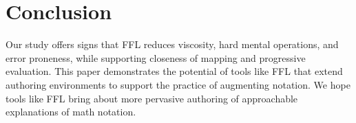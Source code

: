 \section{Conclusion}

Our study offers signs that FFL reduces viscosity, hard mental operations, and error proneness, while supporting closeness of mapping and progressive evaluation. This paper demonstrates the potential of tools like FFL that extend authoring environments to support the practice of augmenting notation. We hope tools like FFL bring about more pervasive authoring of approachable explanations of math notation.
